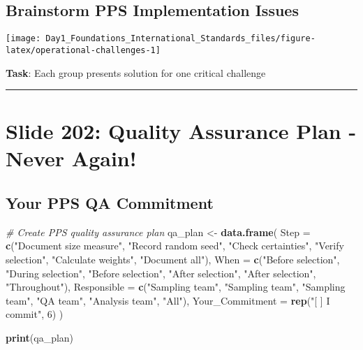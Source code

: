 \documentclass[
]{article}
\newenvironment{Shaded}{\begin{snugshade}}{\end{snugshade}}
\newcommand{\AttributeTok}[1]{\textcolor[rgb]{0.13,0.29,0.53}{#1}}
\newcommand{\CommentTok}[1]{\textcolor[rgb]{0.56,0.35,0.01}{\textit{#1}}}
\newcommand{\DecValTok}[1]{\textcolor[rgb]{0.00,0.00,0.81}{#1}}
\newcommand{\FunctionTok}[1]{\textcolor[rgb]{0.13,0.29,0.53}{\textbf{#1}}}
\newcommand{\NormalTok}[1]{#1}
\newcommand{\OtherTok}[1]{\textcolor[rgb]{0.56,0.35,0.01}{#1}}
\newcommand{\StringTok}[1]{\textcolor[rgb]{0.31,0.60,0.02}{#1}}
\begin{document}
\subsection{Brainstorm PPS Implementation
Issues}\label{brainstorm-pps-implementation-issues}

\texttt{[image: Day1\_Foundations\_International\_Standards\_files/figure-latex/operational-challenges-1]}

\textbf{Task}: Each group presents solution for one critical challenge

\begin{center}\rule{0.5\linewidth}{0.5pt}\end{center}

\section{Slide 202: Quality Assurance Plan - Never
Again!}\label{slide-202-quality-assurance-plan---never-again}

\subsection{Your PPS QA Commitment}\label{your-pps-qa-commitment}

\begin{Shaded}
\begin{Highlighting}[]
\CommentTok{\# Create PPS quality assurance plan}
\NormalTok{qa\_plan }\OtherTok{\textless{}{-}} \FunctionTok{data.frame}\NormalTok{(}
  \AttributeTok{Step =} \FunctionTok{c}\NormalTok{(}\StringTok{"Document size measure"}\NormalTok{, }\StringTok{"Record random seed"}\NormalTok{,}
           \StringTok{"Check certainties"}\NormalTok{, }\StringTok{"Verify selection"}\NormalTok{, }
           \StringTok{"Calculate weights"}\NormalTok{, }\StringTok{"Document all"}\NormalTok{),}
  \AttributeTok{When =} \FunctionTok{c}\NormalTok{(}\StringTok{"Before selection"}\NormalTok{, }\StringTok{"During selection"}\NormalTok{, }\StringTok{"Before selection"}\NormalTok{,}
           \StringTok{"After selection"}\NormalTok{, }\StringTok{"After selection"}\NormalTok{, }\StringTok{"Throughout"}\NormalTok{),}
  \AttributeTok{Responsible =} \FunctionTok{c}\NormalTok{(}\StringTok{"Sampling team"}\NormalTok{, }\StringTok{"Sampling team"}\NormalTok{, }\StringTok{"Sampling team"}\NormalTok{,}
                  \StringTok{"QA team"}\NormalTok{, }\StringTok{"Analysis team"}\NormalTok{, }\StringTok{"All"}\NormalTok{),}
  \AttributeTok{Your\_Commitment =} \FunctionTok{rep}\NormalTok{(}\StringTok{"[ ] I commit"}\NormalTok{, }\DecValTok{6}\NormalTok{)}
\NormalTok{)}

\FunctionTok{print}\NormalTok{(qa\_plan)}
\end{Highlighting}
\end{Shaded}
\end{document}
